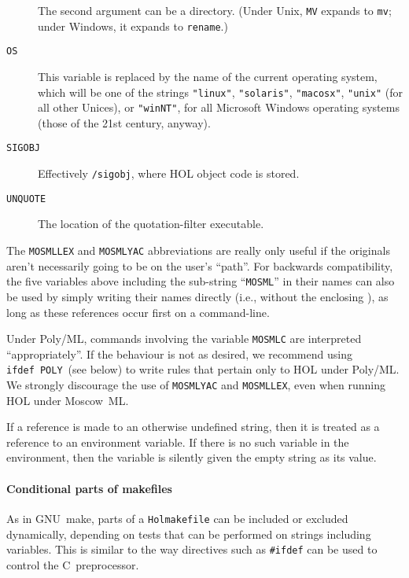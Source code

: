 \begin{description}
  The second argument can be a directory.  (Under Unix, \texttt{MV}
  expands to \texttt{mv}; under Windows, it expands to \texttt{rename}.)
\item[\texttt{OS}] This variable is replaced by the name of the
  current operating system, which will be one of the strings
  \texttt{"linux"}, \texttt{"solaris"}, \texttt{"macosx"},
  \texttt{"unix"} (for all other Unices), or \texttt{"winNT"}, for all
  Microsoft Windows operating systems (those of the 21st century,
  anyway).
\item[\texttt{SIGOBJ}] Effectively \texttt{/sigobj},
  where HOL object code is stored.
  \item[\texttt{UNQUOTE}] The location of the quotation-filter executable.
\end{description}
The \texttt{MOSMLLEX} and \texttt{MOSMLYAC} abbreviations are really
only useful if the originals aren't necessarily going to be on the
user's ``path''.  For backwards compatibility, the five variables
above including the sub-string ``\texttt{MOSML}'' in their names can
also be used by simply writing their names directly (i.e., without the
enclosing \varref{\dots}), as long as these references occur first on
a command-line.

Under Poly/ML, commands involving the variable \texttt{MOSMLC} are interpreted ``appropriately''.
If the behaviour is not as desired, we recommend using \texttt{ifdef~POLY}~(see below) to write rules that pertain only to HOL under Poly/ML.
We strongly discourage the use of \texttt{MOSMLYAC} and \texttt{MOSMLLEX}, even when running HOL under Moscow~ML.

If a reference is made to an otherwise undefined string, then it is
treated as a reference to an environment variable.  If there is no
such variable in the environment, then the variable is silently given
the empty string as its value.

\paragraph{Conditional parts of makefiles}
As in GNU~\textsf{make}, parts of a \texttt{Holmakefile} can be included or excluded dynamically, depending on tests that can be performed on strings including variables.
%
This is similar to the way directives such as \texttt{\#ifdef} can be used to control the C~preprocessor.

